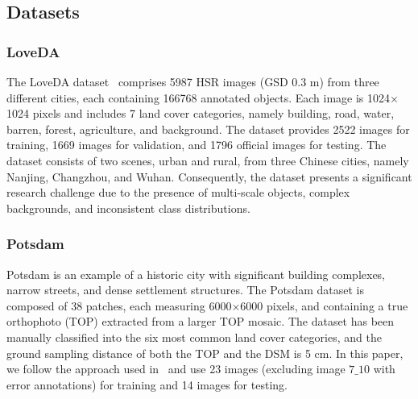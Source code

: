 \documentclass[journal]{IEEEtran}
\begin{document}
\subsection{Datasets}

\subsubsection{LoveDA}
The LoveDA dataset~\cite{wang2021loveda} comprises 5987 HSR images (GSD 0.3 m) from three different cities, each containing 166768 annotated objects. Each image is 1024$\times$1024 pixels and includes 7 land cover categories, namely building, road, water, barren, forest, agriculture, and background. The dataset provides 2522 images for training, 1669 images for validation, and 1796 official images for testing. The dataset consists of two scenes, urban and rural, from three Chinese cities, namely Nanjing, Changzhou, and Wuhan. Consequently, the dataset presents a significant research challenge due to the presence of multi-scale objects, complex backgrounds, and inconsistent class distributions.

\subsubsection{Potsdam}
Potsdam is an example of a historic city with significant building complexes, narrow streets, and dense settlement structures. The Potsdam dataset is composed of 38 patches, each measuring 6000$\times$6000 pixels, and containing a true orthophoto (TOP) extracted from a larger TOP mosaic. The dataset has been manually classified into the six most common land cover categories, and the ground sampling distance of both the TOP and the DSM is 5 cm. In this paper, we follow the approach used in~\cite{wang2022unetformer} and use 23 images (excluding image $7\_10$ with error annotations) for training and 14 images for testing.
\end{document}
